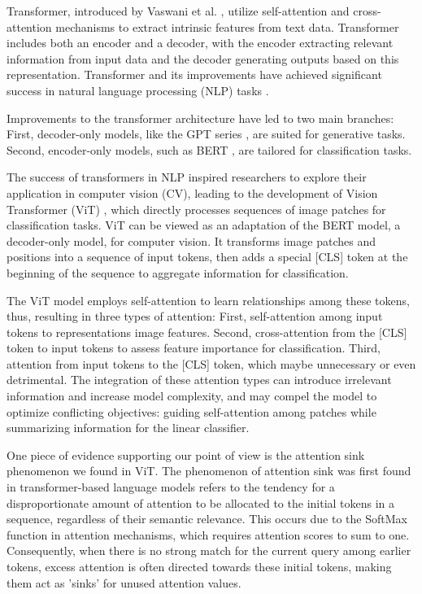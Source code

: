 \documentclass[anon,12pt]{colt2024} %
\begin{document}
Transformer, introduced by Vaswani et al. \cite{vaswani2017attention}, utilize self-attention and cross-attention mechanisms to extract intrinsic features from text data. 
Transformer includes both an encoder and a decoder, with the encoder extracting relevant information from input data and the decoder generating outputs based on this representation.
Transformer and its improvements have achieved significant success in natural language processing (NLP) tasks \cite{vaswani2017attention, devlin2018bert,radford2018improving, brown2020language,ouyang2022training}.

Improvements to the transformer architecture have led to two main branches: First, decoder-only models, like the GPT series \cite{radford2018improving, brown2020language,ouyang2022training}, are suited for generative tasks. Second, encoder-only models, such as BERT  \cite{devlin2018bert}, are tailored for classification tasks.

The success of transformers in NLP inspired researchers to explore their application in computer vision (CV), leading to the development of Vision Transformer (ViT) \cite{dosovitskiy2021an}, which directly processes sequences of image patches for classification tasks.
ViT can be viewed as an adaptation of the BERT model, a decoder-only model, for computer vision.
It transforms image patches and positions into a sequence of input tokens, then adds a special [CLS] token at the beginning of the sequence to aggregate information for classification.

The ViT model employs self-attention to learn relationships among these tokens, thus, resulting in three types of attention:
First, self-attention among input tokens to representations image features. Second, cross-attention from the [CLS] token to input tokens to assess feature importance for classification. Third, attention from input tokens to the [CLS] token, which maybe unnecessary or even detrimental.
The integration of these attention types can introduce irrelevant information and increase model complexity, and may compel the model to optimize conflicting objectives: guiding self-attention among patches while summarizing information for the linear classifier.

One piece of evidence supporting our point of view is the attention sink phenomenon we found in ViT.
The phenomenon of attention sink was first found in transformer-based language models \cite{xiaoefficient} refers to the tendency for a disproportionate amount of attention to be allocated to the initial tokens in a sequence, regardless of their semantic relevance.
This occurs due to the SoftMax function in attention mechanisms, which requires attention scores to sum to one.
Consequently, when there is no strong match for the current query among earlier tokens, excess attention is often directed towards these initial tokens, making them act as 'sinks' for unused attention values.
\end{document}
